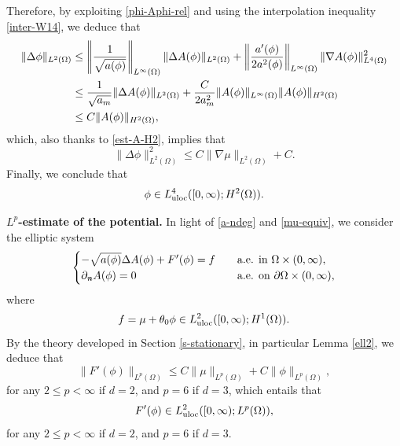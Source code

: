\documentclass[11pt,reqno]{amsart}
\theoremstyle{remark}
\newcommand \norm[1] {\left\Vert #1\right\Vert}
\def\n{\textbf{\textit{n}}}
\numberwithin{equation}{section}
\begin{document}
Therefore, by exploiting \eqref{phi-Aphi-rel} and using the interpolation inequality \eqref{inter-W14}, we deduce that
\begin{align*}
\| \Delta \phi\|_{L^2(\Omega)}
&\leq \norm{\frac{1}{\sqrt{a(\phi)}}}_{L^\infty(\Omega)}
 \| \Delta A(\phi)\|_{L^2(\Omega)}
+ \norm{ \frac{a'(\phi)}{2 a^2(\phi)} }_{L^\infty(\Omega)}
\| \nabla A(\phi)\|_{L^4(\Omega)}^2
\notag
\\
&\leq \frac{1}{\sqrt{a_m}}
 \| \Delta A(\phi)\|_{L^2(\Omega)}
+ \frac{C}{2 a^2_m}
\| A(\phi)\|_{L^\infty(\Omega)} \| A(\phi)\|_{H^2(\Omega)}
\notag
\\
& \leq C \|  A(\phi)\|_{H^2(\Omega)},
\end{align*}
which, also thanks to \eqref{est-A-H2}, implies that
\begin{equation}
\label{est-phi-H2}
\| \Delta \phi\|_{L^2(\Omega)}^2 \leq C \| \nabla \mu\|_{L^2(\Omega)} + C.
\end{equation}
Finally, we conclude that
\begin{equation}
\label{bound-phi-H2}
\phi \in L_{\rm uloc}^4([0,\infty); H^2(\Omega)).
\end{equation}

\medskip

\textbf{$L^p$-estimate of the potential.} In light of \eqref{a-ndeg} and \eqref{mu-equiv}, we consider the elliptic system 
\begin{align*}
\label{Aphi-ELL-2}
\begin{cases}
- \sqrt{a(\phi)}\Delta A(\phi)+ F'(\phi) = f \quad &\text{a.e. in }\Omega 
\times (0,\infty), \\
\partial_{\n} A(\phi)=0\quad &\text{a.e. on }\partial \Omega \times (0,\infty),
\end{cases}
\end{align*}
where
$$
f=\mu+\theta_0 \phi \in L_{\rm uloc}^2([0,\infty); H^1(\Omega)).
$$
By the theory developed in Section \ref{s-stationary}, in particular Lemma \ref{ell2}, we deduce that
\begin{equation}
\label{F'-LP}
\| F'(\phi)\|_{L^p(\Omega)}\leq C \| \mu\|_{L^p(\Omega)} + C \| \phi\|_{L^p(\Omega)},
\end{equation}
 for any $2 \leq p < \infty$ if $d=2$, and $p=6$ if $d=3$, which entails that
 \begin{equation}
\label{bound-F'-Lp}
F'(\phi) \in L_{\rm uloc}^2([0,\infty); L^p(\Omega)), 
\end{equation}
 for any $2 \leq p < \infty$ if $d=2$, and $p=6$ if $d=3$.
\end{document}

